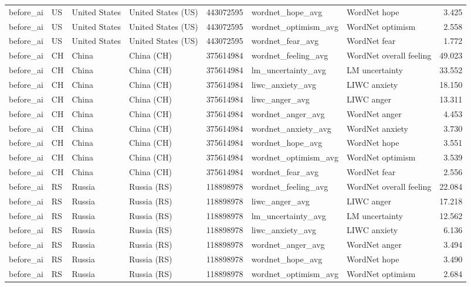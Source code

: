 \begin{tabular}{llllrllr}
before\_ai & US & United States & United States (US) & 443072595 & wordnet\_hope\_avg & WordNet hope & 3.425 \\
before\_ai & US & United States & United States (US) & 443072595 & wordnet\_optimism\_avg & WordNet optimism & 2.558 \\
before\_ai & US & United States & United States (US) & 443072595 & wordnet\_fear\_avg & WordNet fear & 1.772 \\
before\_ai & CH & China & China (CH) & 375614984 & wordnet\_feeling\_avg & WordNet overall feeling & 49.023 \\
before\_ai & CH & China & China (CH) & 375614984 & lm\_uncertainty\_avg & LM uncertainty & 33.552 \\
before\_ai & CH & China & China (CH) & 375614984 & liwc\_anxiety\_avg & LIWC anxiety & 18.150 \\
before\_ai & CH & China & China (CH) & 375614984 & liwc\_anger\_avg & LIWC anger & 13.311 \\
before\_ai & CH & China & China (CH) & 375614984 & wordnet\_anger\_avg & WordNet anger & 4.453 \\
before\_ai & CH & China & China (CH) & 375614984 & wordnet\_anxiety\_avg & WordNet anxiety & 3.730 \\
before\_ai & CH & China & China (CH) & 375614984 & wordnet\_hope\_avg & WordNet hope & 3.551 \\
before\_ai & CH & China & China (CH) & 375614984 & wordnet\_optimism\_avg & WordNet optimism & 3.539 \\
before\_ai & CH & China & China (CH) & 375614984 & wordnet\_fear\_avg & WordNet fear & 2.556 \\
before\_ai & RS & Russia & Russia (RS) & 118898978 & wordnet\_feeling\_avg & WordNet overall feeling & 22.084 \\
before\_ai & RS & Russia & Russia (RS) & 118898978 & liwc\_anger\_avg & LIWC anger & 17.218 \\
before\_ai & RS & Russia & Russia (RS) & 118898978 & lm\_uncertainty\_avg & LM uncertainty & 12.562 \\
before\_ai & RS & Russia & Russia (RS) & 118898978 & liwc\_anxiety\_avg & LIWC anxiety & 6.136 \\
before\_ai & RS & Russia & Russia (RS) & 118898978 & wordnet\_anger\_avg & WordNet anger & 3.494 \\
before\_ai & RS & Russia & Russia (RS) & 118898978 & wordnet\_hope\_avg & WordNet hope & 3.490 \\
before\_ai & RS & Russia & Russia (RS) & 118898978 & wordnet\_optimism\_avg & WordNet optimism & 2.684 \\

\end{tabular}
